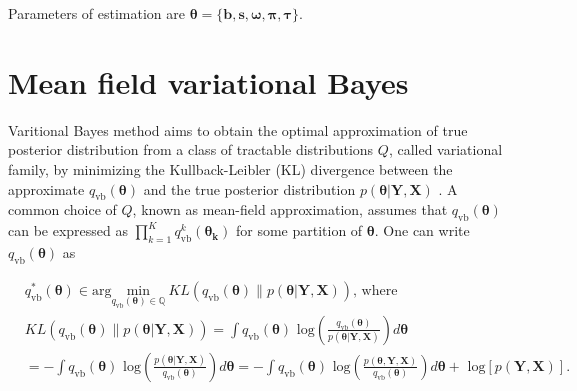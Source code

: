 \documentclass[
]{book}
\begin{document}
Parameters of estimation are \(\boldsymbol{\theta} = \{ \boldsymbol{b,s,\omega,\pi,\tau}\}\).

\hypertarget{MFVB}{%
\section{Mean field variational Bayes}\label{MFVB}}

Varitional Bayes method aims to obtain the optimal approximation of true posterior distribution from a class of tractable distributions \(Q\), called variational family, by minimizing the Kullback-Leibler (KL) divergence between the approximate \(q_{\text{vb}}(\boldsymbol{\theta})\) and the true posterior distribution \(p(\boldsymbol{\theta|\mathbf{Y,X}})\) \citep{attias2000speech}. A common choice of \(Q\), known as mean-field approximation, assumes that \(q_{\text{vb}}(\boldsymbol{\theta})\) can be expressed as \(\prod_{k=1}^K q^k_{\text{vb}}(\boldsymbol{\theta_k})\) for some partition of \(\boldsymbol{\theta}\). One can write \(q_{\text{vb}}(\boldsymbol{\theta})\) as

\begin{align}\label{eq:KL_div}
    & q_{\text{vb}}^{*}(\boldsymbol{\theta}) \in \text{arg} \underset{q_{\text{vb}}(\boldsymbol{\theta}) \in \mathbb{Q}}{\text{min}} \ KL(q_{\text{vb}}(\boldsymbol{\theta})\|p(\boldsymbol{\theta |Y,X})) \text{, where} \nonumber \\
    & KL(q_{\text{vb}}(\boldsymbol{\theta})\|p(\boldsymbol{\theta|Y,X})) = \int q_{\text{vb}}(\boldsymbol{\theta}) \text{ log} \left (\frac{q_{\text{vb}}(\boldsymbol{\theta})}{p(\boldsymbol{\theta|Y,X})}\right)d\boldsymbol{\theta} \nonumber \\
    & = - \int q_{\text{vb}}(\boldsymbol{\theta}) \text{ log} \left (\frac{p(\boldsymbol{\theta|Y,X})}{q_{\text{vb}}(\boldsymbol{\theta})}\right)d\boldsymbol{\theta} 
     = - \int q_{\text{vb}}(\boldsymbol{\theta}) \text{ log} \left (\frac{p(\boldsymbol{\theta,Y,X})}{q_{\text{vb}}(\boldsymbol{\theta})}\right)d\boldsymbol{\theta} + \text{ log} \left[ p(\boldsymbol{Y,X}) \right].
\end{align}
\end{document}
